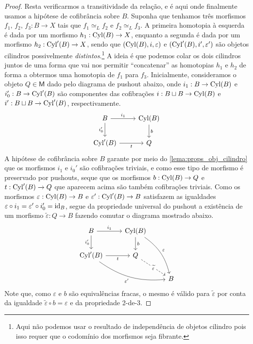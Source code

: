 \begin{proof}
  Resta verificarmos a transitividade da relação, e é aqui onde finalmente usamos a hipótese de cofibrância sobre $B$.
  Suponha que tenhamos três morfismos $f_{1},\,f_{2},\,f_{3}: B \to X$ tais que $f_{1} \simeq_{L} f_{2}$ e $f_{2} \simeq_{L} f_{3}$.
  A primeira homotopia à esquerda é dada por um morfismo $h_{1}: \mathrm{Cyl}(B) \to X$, enquanto a segunda é dada por um morfismo $h_{2}: \mathrm{Cyl}'(B) \to X$, sendo que $(\mathrm{Cyl}(B),i,\varepsilon)$ e $(\mathrm{Cyl}'(B),i',\varepsilon')$ são objetos cilindros possivelmente \emph{distintos}.\footnote{Aqui não podemos usar o resultado de independência de objetos cilindro pois isso requer que o codomínio dos morfismos seja fibrante.}
  A ideia é que podemos colar os dois cilindros juntos de uma forma que vai nos permitir ``concatenar'' as homotopias $h_{1}$ e $h_{2}$ de forma a obtermos uma homotopia de $f_{1}$ para $f_{3}$.
  Inicialmente, consideramos o objeto $Q \in \mathsf{M}$ dado pelo diagrama de pushout abaixo, onde $i_{1}: B \to \mathrm{Cyl}(B)$ e $i_{0}': B \to \mathrm{Cyl}'(B)$ são componentes das cofibrações $i: B \sqcup B \to \mathrm{Cyl}(B)$ e $i': B \sqcup B \to \mathrm{Cyl}'(B)$, respectivamente.
  \begin{displaymath}
    \begin{tikzcd}
      B
      \arrow[r, "i_{1}"]
      \arrow[d, "i_{0}'" swap]
      & \Cyl(B)
      \arrow[d, "b"]
      \\ \Cyl'(B)
      \arrow[r, "t" swap]
      & Q
    \end{tikzcd}
  \end{displaymath}
  A hipótese de cofibrância sobre $B$ garante por meio do \cref{lema:props_obj_cilindro} que os morfismos $i_{1}$ e $i_{0}'$ são cofibrações triviais, e como esse tipo de morfismo é preservado por pushouts, seque que os morfismos $b: \mathrm{Cyl}(B) \to Q$ e $t: \mathrm{Cyl}'(B) \to Q$ que aparecem acima são também cofibrações triviais.
  Como os morfismos $\varepsilon: \mathrm{Cyl}(B) \to B$ e $\varepsilon': \mathrm{Cyl}'(B) \to B$ satisfazem as igualdades $\varepsilon \circ i_{1} = \varepsilon' \circ i_{0}' = \mathrm{id}_{B}$, segue da propriedade universal do pushout a existência de um morfismo $\widetilde{\varepsilon}: Q \to B$ fazendo comutar o diagrama mostrado abaixo.
  \begin{displaymath}
    \begin{tikzcd}
      B
      \arrow[r, "i_{1}"]
      \arrow[d, "i_{0}'" swap]
      & \Cyl(B)
      \arrow[d, "b"]
      \arrow[rdd, bend left=20, "\varepsilon"]
      \\ \Cyl'(B)
      \arrow[r, "t" swap]
      \arrow[rrd, bend right=20, "\varepsilon'" swap]
      & Q
      \arrow[rd, dashed, "\widetilde{\varepsilon}" description]
      \\ & & B
    \end{tikzcd}
  \end{displaymath}
  Note que, como $\varepsilon$ e $b$ são equivalências fracas, o mesmo é válido para $\widetilde{\varepsilon}$ por conta da igualdade $\widetilde{\varepsilon} \circ b = \varepsilon$ e da propriedade 2-de-3.


\end{proof}
